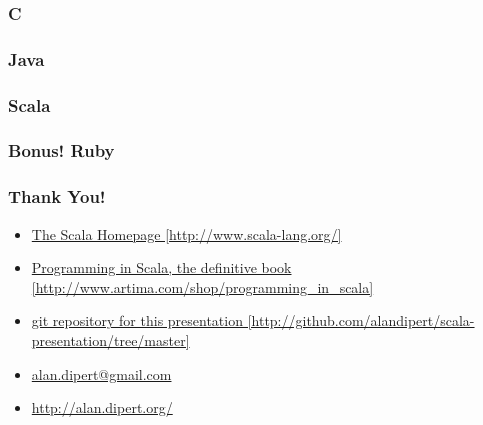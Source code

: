\begin{frame} 
\frametitle{C}
\tt\tiny{

}
\end{frame} 

\begin{frame} 
\frametitle{Java}
\tt\tiny{

}
\end{frame} 

\begin{frame} 
\frametitle{Scala}
\tt\tiny{

}
\end{frame} 

\begin{frame} 
\frametitle{Bonus! Ruby}
\tt\tiny{

}
\end{frame} 

\begin{frame} 
\frametitle{Thank You!}
\begin{itemize}
  \item<1-> \href{http://www.scala-lang.org/}{The Scala Homepage [http://www.scala-lang.org/]}
  \item<1-> \href{http://www.artima.com/shop/programming\_in\_scala}{Programming in Scala, the definitive book [http://www.artima.com/shop/programming\_in\_scala]}
  \item<1-> \href{http://github.com/alandipert/scala-presentation/tree/master}{git repository for this presentation [http://github.com/alandipert/scala-presentation/tree/master]}
\end{itemize}
\begin{itemize}
  \item<1-> \href{mailto:alan.dipert@gmail.com}{alan.dipert@gmail.com}
  \item<1-> \href{http://alan.dipert.org/}{http://alan.dipert.org/}
\end{itemize}
\end{frame} 

 
